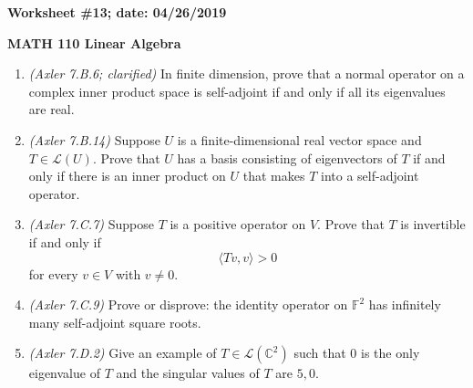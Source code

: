 \documentclass{article}
\newcommand{\CC}{\mathbb{C}}
\newcommand{\cL}{\mathcal{L}}
\begin{document}
{\bf Worksheet \#13; date: 04/26/2019}

{\bf MATH 110 Linear Algebra}

\begin{enumerate}
\item {\em (Axler 7.B.6; clarified)} In finite dimension, prove that a normal operator on a complex inner product space is self-adjoint if and only if all its eigenvalues are real.

\item {\em (Axler 7.B.14)} Suppose $U$ is a finite-dimensional real vector space and $T \in \cL(U)$. Prove that $U$ has a basis consisting of eigenvectors of $T$ if and only if there is an inner product on $U$ that makes $T$ into a self-adjoint operator.

\item {\em (Axler 7.C.7)} Suppose $T$ is a positive operator on $V$. Prove that $T$ is invertible if and only if
\[
	\langle Tv, v \rangle > 0
\]
for every $v \in V$ with $v \ne 0$.

\item {\em (Axler 7.C.9)} Prove or disprove: the identity operator on $\mathbb{F}^2$ has infinitely many self-adjoint square roots.

\item {\em (Axler 7.D.2)} Give an example of $T \in \cL(\CC^2)$ such that $0$ is the only eigenvalue of $T$ and the singular values of $T$ are $5, 0$.

\end{enumerate}
\end{document}
